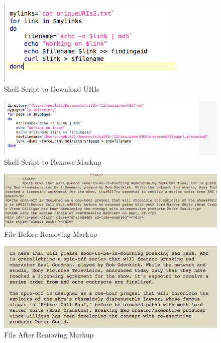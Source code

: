 \documentclass{article}
\begin{document}
\begin{figure}[H]
\centering
\includegraphics{q1/downloadURI}
\caption{Shell Script to Download URIs}
\label{downloadURI}
\end{figure}

\begin{figure}[H]
\centering
\includegraphics[scale=0.50]{q1/rmMarkupURI}
\caption{Shell Script to Remove Markup}
\label{rmMarkup}
\end{figure}

\begin{figure}[H]
\centering
\includegraphics[scale=0.40]{q1/beforermmarkup}
\caption{File Before Removing Markup}
\label{before}
\end{figure}

\begin{figure}[H]
\centering
\includegraphics[scale=0.50]{q1/afterrmmarkup}
\caption{File After Removing Markup}
\label{after}
\end{figure}
\end{document}
